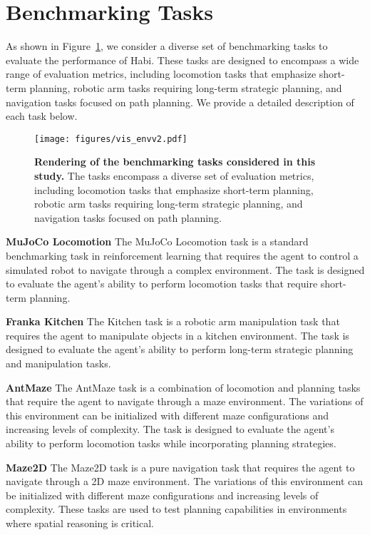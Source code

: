 \appendix
\onecolumn

\section{Benchmarking Tasks}
\label{appendix:benchmarks}
As shown in Figure~\ref{fig:visualize-env}, we consider a diverse set of benchmarking tasks to evaluate the performance of Habi. These tasks are designed to encompass a wide range of evaluation metrics, including locomotion tasks that emphasize short-term planning, robotic arm tasks requiring long-term strategic planning, and navigation tasks focused on path planning. We provide a detailed description of each task below.

\begin{figure}[h]
    \centering
    \texttt{[image: figures/vis\_envv2.pdf]}
    \caption{\textbf{Rendering of the benchmarking tasks considered in this study.} The tasks encompass a diverse set of evaluation metrics, including locomotion tasks that emphasize short-term planning, robotic arm tasks requiring long-term strategic planning, and navigation tasks focused on path planning.}
    \label{fig:visualize-env}
\end{figure}

\textbf{MuJoCo Locomotion} \; The MuJoCo Locomotion task is a standard benchmarking task in reinforcement learning that requires the agent to control a simulated robot to navigate through a complex environment. The task is designed to evaluate the agent's ability to perform locomotion tasks that require short-term planning.

\textbf{Franka Kitchen} \; The Kitchen task is a robotic arm manipulation task that requires the agent to manipulate objects in a kitchen environment. The task is designed to evaluate the agent's ability to perform long-term strategic planning and manipulation tasks.

\textbf{AntMaze} \; The AntMaze task is a combination of locomotion and planning tasks that require the agent to navigate through a maze environment. The variations of this environment can be initialized with different maze configurations and increasing levels of complexity. The task is designed to evaluate the agent's ability to perform locomotion tasks while incorporating planning strategies.

\textbf{Maze2D} \; The Maze2D task is a pure navigation task that requires the agent to navigate through a 2D maze environment. The variations of this environment can be initialized with different maze configurations and increasing levels of complexity. These tasks are used to test planning capabilities in environments where spatial reasoning is critical.

